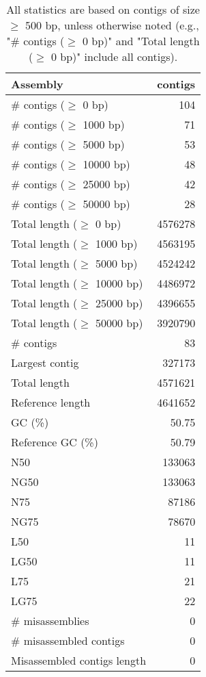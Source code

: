 \documentclass[12pt,a4paper]{article}
\begin{document}
\begin{table}[ht]
\begin{center}
\caption{All statistics are based on contigs of size $\geq$ 500 bp, unless otherwise noted (e.g., "\# contigs ($\geq$ 0 bp)" and "Total length ($\geq$ 0 bp)" include all contigs).}
\begin{tabular}{|l*{1}{|r}|}
\hline
Assembly & contigs \\ \hline
\# contigs ($\geq$ 0 bp) & 104 \\ \hline
\# contigs ($\geq$ 1000 bp) & 71 \\ \hline
\# contigs ($\geq$ 5000 bp) & 53 \\ \hline
\# contigs ($\geq$ 10000 bp) & 48 \\ \hline
\# contigs ($\geq$ 25000 bp) & 42 \\ \hline
\# contigs ($\geq$ 50000 bp) & 28 \\ \hline
Total length ($\geq$ 0 bp) & 4576278 \\ \hline
Total length ($\geq$ 1000 bp) & 4563195 \\ \hline
Total length ($\geq$ 5000 bp) & 4524242 \\ \hline
Total length ($\geq$ 10000 bp) & 4486972 \\ \hline
Total length ($\geq$ 25000 bp) & 4396655 \\ \hline
Total length ($\geq$ 50000 bp) & 3920790 \\ \hline
\# contigs & 83 \\ \hline
Largest contig & 327173 \\ \hline
Total length & 4571621 \\ \hline
Reference length & 4641652 \\ \hline
GC (\%) & 50.75 \\ \hline
Reference GC (\%) & 50.79 \\ \hline
N50 & 133063 \\ \hline
NG50 & 133063 \\ \hline
N75 & 87186 \\ \hline
NG75 & 78670 \\ \hline
L50 & 11 \\ \hline
LG50 & 11 \\ \hline
L75 & 21 \\ \hline
LG75 & 22 \\ \hline
\# misassemblies & 0 \\ \hline
\# misassembled contigs & 0 \\ \hline
Misassembled contigs length & 0 \\ \hline

\end{tabular}
\end{center}
\end{table}
\end{document}

